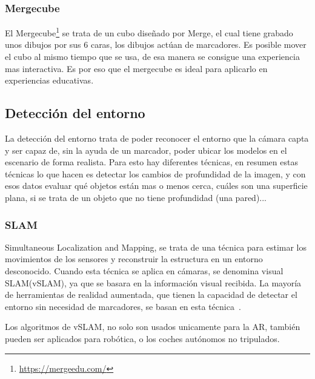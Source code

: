 





	\subsubsection{Mergecube}\label{section:mergecube}
	
	El Mergecube\footnote{\url{https://mergeedu.com/}} se trata de un cubo diseñado por Merge, el cual tiene grabado unos dibujos por sus 6 caras, los dibujos actúan de marcadores. Es posible mover el cubo al mismo tiempo que se usa, de esa manera se consigue una experiencia mas interactiva. Es por eso que el mergecube es ideal para aplicarlo en experiencias educativas.
	
	
	\subsection{Detección del entorno}
	
	La detección del entorno trata de poder reconocer el entorno que la cámara capta y ser capaz de, sin la ayuda de un marcador, poder ubicar los modelos en el escenario de forma realista.
	Para esto hay diferentes técnicas, en resumen estas técnicas lo que hacen es detectar los cambios de profundidad de la imagen, y con esos datos evaluar qué objetos están mas o menos cerca, cuáles son una superficie plana, si se trata de un objeto que no tiene profundidad (una pared)...
	
	\subsubsection{SLAM}
	
	Simultaneous Localization and Mapping, se trata de una técnica para estimar los movimientos de los sensores y reconstruir la estructura en un entorno desconocido. Cuando esta técnica se aplica en cámaras, se denomina visual SLAM(vSLAM), ya que se basara en la información visual recibida.
	La mayoría de herramientas de realidad aumentada, que tienen la capacidad de detectar el entorno sin necesidad de marcadores, se basan en esta técnica~\cite{taketomi2017visual}.
	
	Los algoritmos de vSLAM, no solo son usados unicamente para la AR, también pueden ser aplicados para robótica, o los coches autónomos no tripulados.
	
